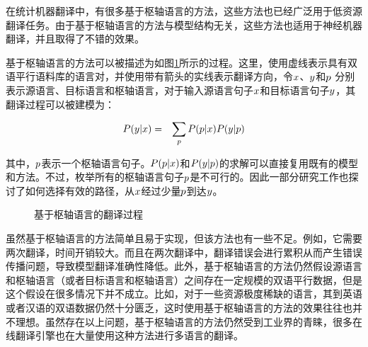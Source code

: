 \parinterval 在统计机器翻译中，有很多基于枢轴语言的方法，这些方法也已经广泛用于低资源翻译任务。由于基于枢轴语言的方法与模型结构无关，这些方法也适用于神经机器翻译，并且取得了不错的效果。

\parinterval 基于枢轴语言的方法可以被描述为如图\ref{fig:16-11}所示的过程。这里，使用虚线表示具有双语平行语料库的语言对，并使用带有箭头的实线表示翻译方向，令${x}$、${y}$和${p}$ 分别表示源语言、目标语言和枢轴语言，对于输入源语言句子${x}$和目标语言句子${y}$，其翻译过程可以被建模为：

\begin{eqnarray}
{{P}({y}|{x})} & = & {\sum_{{p}}{{P}({p}|{x}){P}({y}|{p})}}
\label{eq:16-7}
\end{eqnarray}

\noindent 其中，${p}$表示一个枢轴语言句子。${P}({p}|{x})$和${P}({y}|{p})$的求解可以直接复用既有的模型和方法。不过，枚举所有的枢轴语言句子${p}$是不可行的。因此一部分研究工作也探讨了如何选择有效的路径，从${x}$经过少量${p}$到达${y}$。

\begin{figure}[h]
\centering

\caption{基于枢轴语言的翻译过程}
\label{fig:16-11}
\end{figure}

\parinterval 虽然基于枢轴语言的方法简单且易于实现，但该方法也有一些不足。例如，它需要两次翻译，时间开销较大。而且在两次翻译中，翻译错误会进行累积从而产生错误传播问题，导致模型翻译准确性降低。此外，基于枢轴语言的方法仍然假设源语言和枢轴语言（或者目标语言和枢轴语言）之间存在一定规模的双语平行数据，但是这个假设在很多情况下并不成立。比如，对于一些资源极度稀缺的语言，其到英语或者汉语的双语数据仍然十分匮乏，这时使用基于枢轴语言的方法的效果往往也并不理想。虽然存在以上问题，基于枢轴语言的方法仍然受到工业界的青睐，很多在线翻译引擎也在大量使用这种方法进行多语言的翻译。


